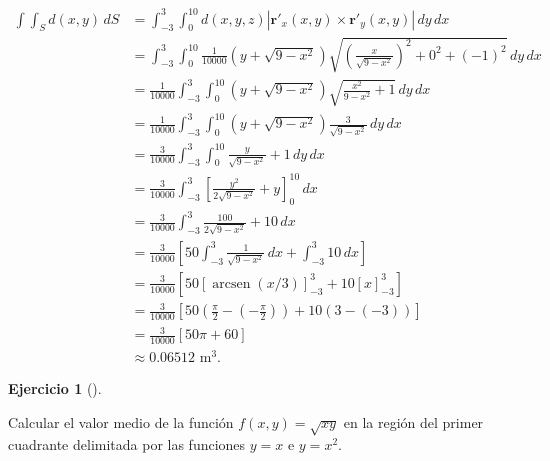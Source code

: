 \documentclass[
  spanish,
  a4paper,
]{scrreport}
\theoremstyle{definition}
\newtheorem{exercise}{Ejercicio}[chapter]
\theoremstyle{remark}
\begin{document}
\begin{tcolorbox}
\begin{align*}
\int\int_S d(x,y)\,dS
&= \int_{-3}^3 \int_0^{10} d(x,y,z) |\mathbf{r}'_x(x,y) \times \mathbf{r}'_y(x,y)|\,dy\,dx \\
&= \int_{-3}^3 \int_0^{10} \frac{1}{10000}(y + \sqrt{9-x^2}) \sqrt{\left(\frac{x}{\sqrt{9-x^2}}\right)^2 + 0^2 + (-1)^2}\,dy\,dx \\
&= \frac{1}{10000}\int_{-3}^3 \int_0^{10} (y + \sqrt{9-x^2}) \sqrt{\frac{x^2}{9-x^2} + 1}\,dy\,dx \\
&= \frac{1}{10000}\int_{-3}^3 \int_0^{10} (y + \sqrt{9-x^2}) \frac{3}{\sqrt{9-x^2}}\,dy\,dx \\ 
&= \frac{3}{10000}\int_{-3}^3 \int_0^{10} \frac{y}{\sqrt{9-x^2}} + 1\,dy\,dx \\
&= \frac{3}{10000}\int_{-3}^3 \left[\frac{y^2}{2\sqrt{9-x^2}} + y\right]_0^{10}\,dx \\
&= \frac{3}{10000}\int_{-3}^3 \frac{100}{2\sqrt{9-x^2}} + 10\,dx \\
&= \frac{3}{10000}\left[50\int_{-3}^3 \frac{1}{\sqrt{9-x^2}}\,dx + \int_{-3}^3 10\,dx\right] \\
&= \frac{3}{10000}\left[50[\operatorname{arcsen}(x/3)]_{-3}^3 + 10[ x ]_{-3}^3\right] \\
&= \frac{3}{10000}\left[50\left(\frac{\pi}{2} - \left(-\frac{\pi}{2}\right)\right) + 10(3 - (-3))\right] \\
&= \frac{3}{10000}\left[50\pi + 60\right] \\
&\approx 0.06512 \mbox{ m}^3.
\end{align*}

\end{tcolorbox}

\begin{exercise}[]\protect\hypertarget{exr-integral-doble-valor-medio}{}\label{exr-integral-doble-valor-medio}

Calcular el valor medio de la función \(f(x,y)=\sqrt{xy}\) en la región
del primer cuadrante delimitada por las funciones \(y=x\) e \(y=x^2\).

\end{exercise}
\end{document}

